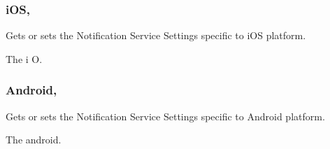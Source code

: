 \subsubsection[{i\+O\+S}]{ i\+O\+S\hspace{0.3cm}{\ttfamily [get]}, {\ttfamily [set]}}\label{class_voxel_busters_1_1_native_plugins_1_1_notification_service_settings_a3bf35f819c6fe2c2806c637c02127ff8}


Gets or sets the Notification Service Settings specific to i\+O\+S platform. 

The i O.\hypertarget{class_voxel_busters_1_1_native_plugins_1_1_notification_service_settings_a1c2d6ed884eda0a6f3e7bb4913332b0a}{}
\subsubsection[{Android}]{ Android\hspace{0.3cm}{\ttfamily [get]}, {\ttfamily [set]}}\label{class_voxel_busters_1_1_native_plugins_1_1_notification_service_settings_a1c2d6ed884eda0a6f3e7bb4913332b0a}


Gets or sets the Notification Service Settings specific to Android platform. 

The android.